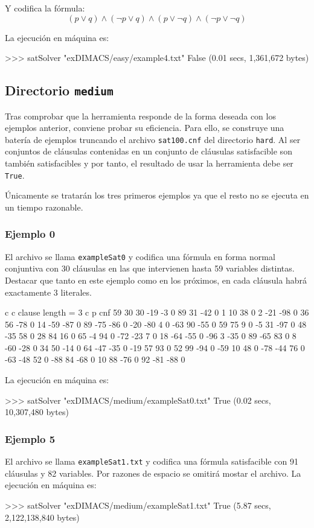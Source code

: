 Y codifica la fórmula:
$$(p \vee q)\wedge (\neg p \vee q)\wedge ( p \vee \neg q)\wedge (\neg p \vee \neg q)$$

La ejecución en máquina es:
\begin{code}
>>> satSolver "exDIMACS/easy/example4.txt"
False
(0.01 secs, 1,361,672 bytes)
\end{code}

\newpage
\subsection{Directorio \texttt{medium}}
Tras comprobar que la herramienta responde de la forma deseada con los ejemplos anterior, conviene probar su eficiencia. Para ello, se construye una batería de ejemplos truncando el archivo \texttt{sat100.cnf} del directorio \texttt{hard}. Al ser conjuntos de cláusulas contenidas en un conjunto de cláusulas satisfacible son también satisfacibles y por tanto, el resultado de usar la herramienta debe ser \texttt{True}.

Únicamente se tratarán los tres primeros ejemplos ya que el resto no se ejecuta en un tiempo razonable.

\subsubsection{Ejemplo 0}
El archivo se llama \texttt{exampleSat0} y codifica una fórmula en forma normal conjuntiva con 30 cláusulas en las que intervienen hasta 59 variables distintas. Destacar que tanto en este ejemplo como en los próximos, en cada cláusula habrá exactamente 3 literales.

\begin{codigo}
c 
c    clause length = 3 
c
p cnf 59 30
30 -19 -3 0
89 31 -42 0
1 10 38 0
2 -21 -98 0
36 56 -78 0
14 -59 -87 0
89 -75 -86 0
-20 -80 4 0
-63 90 -55 0
59 75 9 0
-5 31 -97 0
48 -35 58 0
28 84 16 0
65 -4 94 0
-72 -23 7 0
18 -64 -55 0
-96 3 -35 0
89 -65 83 0
8 -60 -28 0
34 50 -14 0
64 -47 -35 0
-19 57 93 0
52 99 -94 0
-59 10 48 0
-78 -44 76 0
-63 -48 52 0
-88 84 -68 0
10 88 -76 0
92 -81 -88 0
\end{codigo}

La ejecución en máquina es:
\begin{code}
>>> satSolver "exDIMACS/medium/exampleSat0.txt"
True
(0.02 secs, 10,307,480 bytes)
\end{code}

\subsubsection{Ejemplo 5}
El archivo se llama \texttt{exampleSat1.txt} y codifica una fórmula satisfacible con 91 cláusulas y 82 variables. Por razones de espacio se omitirá mostar el archivo. La ejecución en máquina es:
\begin{code}
>>> satSolver "exDIMACS/medium/exampleSat1.txt"
True
(5.87 secs, 2,122,138,840 bytes)
\end{code}

